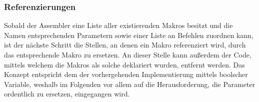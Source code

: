 \subsubsection{Referenzierungen}

Sobald der Assembler eine Liste aller existierenden Makros besitzt und die Namen entsprechenden Parametern sowie einer Liste an Befehlen zuordnen kann, ist der nächste Schritt die Stellen, an denen ein Makro referenziert wird, durch das entsprechende Makro zu ersetzen. An dieser Stelle kann außerdem der Code, mittels welchem die Makros als solche deklariert wurden, entfernt werden. Das Konzept entspricht dem der vorhergehenden Implementierung mittels boolscher Variable, weshalb im Folgenden vor allem auf die Herausforderung, die Parameter ordentlich zu ersetzen, eingegangen wird.
